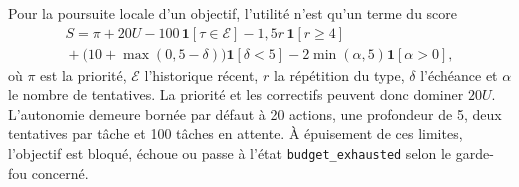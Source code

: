 Pour la poursuite locale d'un objectif, l'utilité n'est qu'un terme du score
\begin{multline*}
S=\pi+20U-100\,\mathbf{1}[\tau\in\mathcal{E}]
-1{,}5r\,\mathbf{1}[r\geq4] \\
{}+\bigl(10+\max(0,5-\delta)\bigr)\mathbf{1}[\delta<5]
-2\min(\alpha,5)\mathbf{1}[\alpha>0],
\end{multline*}
où $\pi$ est la priorité, $\mathcal{E}$ l'historique récent, $r$ la répétition du type,
$\delta$ l'échéance et $\alpha$ le nombre de tentatives. La priorité et les correctifs
peuvent donc dominer $20U$. L'autonomie demeure bornée par défaut à 20 actions, une
profondeur de 5, deux tentatives par tâche et 100 tâches en attente. À épuisement de ces
limites, l'objectif est bloqué, échoue ou passe à l'état
\texttt{budget\_exhausted} selon le garde-fou concerné.
